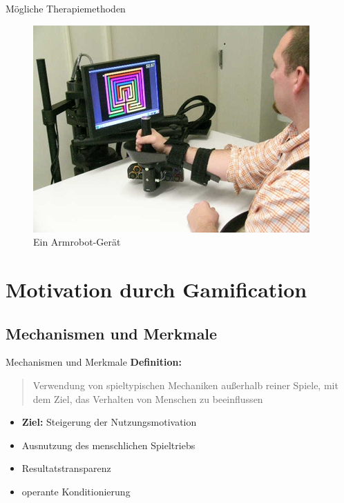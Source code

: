\documentclass[hyphens]{beamer}
\begin{document}
\begin{frame}{Mögliche Therapiemethoden}
\begin{figure}
	\includegraphics[scale=0.6]{pics/armrobot}
	\caption{Ein Armrobot-Gerät}
\end{figure}
\end{frame}

\section{Motivation durch Gamification}

\subsection{Mechanismen und Merkmale}

\begin{frame}{Mechanismen und Merkmale}
\textbf{Definition:} \\
\blockquote{Verwendung von spieltypischen Mechaniken außerhalb reiner Spiele, mit dem Ziel, das Verhalten von Menschen zu beeinflussen}
\hspace{0.5cm}
\begin{itemize}
	\item \textbf{Ziel:} Steigerung der Nutzungsmotivation
	\item Ausnutzung des menschlichen Spieltriebs
	\item Resultatstransparenz
	\item operante Konditionierung
\end{itemize}
\end{frame}
\end{document}
